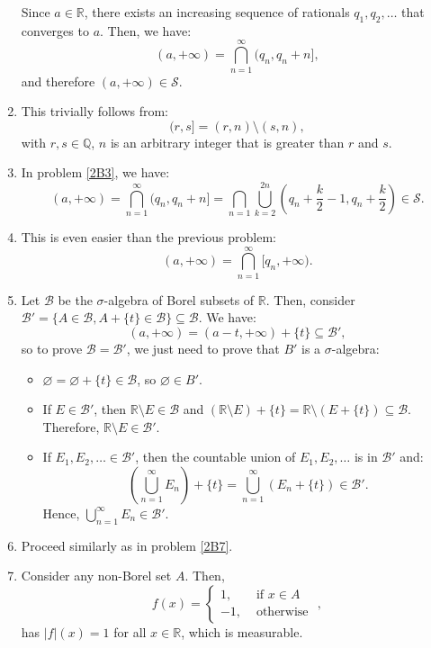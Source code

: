 \begin{enumerate}[label=\textbf{2B.\arabic*}]
    Since \( a \in \mathbb{R} \), there exists an increasing sequence of
    rationals \( q_{1}, q_{2}, \ldots  \) that converges to \( a \). Then, we
    have:
    \[
      (a, +\infty) = \bigcap_{n = 1}^{\infty} (q_{n}, q_{n} + n]
    ,\] and therefore \( (a, +\infty) \in \mathcal{S} \).
  \item This trivially follows from:
    \[
      (r, s] = (r, n) \setminus (s, n)
    ,\] with \( r, s \in \mathbb{Q} \), \( n \) is an arbitrary integer that is
    greater than \( r \) and \( s \).
  \item In problem \ref{2B3}, we have:
    \[
      (a, +\infty) = \bigcap_{n = 1}^{\infty} (q_{n}, q_{n} + n] = \bigcap_{n =
      1} \bigcup_{k = 2}^{2n} \left( q_{n} + \frac{k}{2} - 1, q_{n} + \frac{k}{2}
      \right) \in \mathcal{S}
    .\]
  \item This is even easier than the previous problem:
    \[
      (a, +\infty) = \bigcap_{n = 1}^{\infty} [q_{n}, +\infty)
    .\]
  \item \label{2B7}
    Let \( \mathcal{B} \) be the \( \sigma \)-algebra of Borel subsets of \(
    \mathbb{R}\). Then, consider \( \mathcal{B}' = \{A \in \mathcal{B}, A +
    \{t\} \in \mathcal{B} \} \subseteq \mathcal{B}  \). We have:
    \[
      (a, +\infty) = (a - t, +\infty)  + \{t\} \subseteq \mathcal{B}' 
    ,\] so to prove \( \mathcal{B} = \mathcal{B}' \), we just need to prove that
    \( B'\) is a \( \sigma \)-algebra:
    \begin{itemize}
    \item \( \varnothing = \varnothing + \{t\} \in \mathcal{B}  \), so \(
      \varnothing \in B' \).
    \item If \( E \in \mathcal{B}' \), then \( \mathbb{R} \setminus E \in
      \mathcal{B} \) and \( (\mathbb{R} \setminus E) + \{t\} = \mathbb{R}
      \setminus (E + \{t\}  ) \subseteq \mathcal{B}  \). Therefore, \(
      \mathbb{R} \setminus E \in \mathcal{B}' \).
    \item If \( E_{1}, E_{2}, \ldots \in \mathcal{B}' \), then the countable
      union of \( E_{1}, E_{2}, \ldots  \) is in \( \mathcal{B}' \) and:
      \[
        \left( \bigcup_{n = 1}^{\infty} E_{n} \right) + \{t\}   = \bigcup_{n =
        1}^{\infty} \left( E_{n} + \{t\}   \right) \in \mathcal{B}'
      .\] Hence, \( \bigcup_{n = 1}^{\infty} E_{n} \in \mathcal{B}' \).
    \end{itemize}
  \item Proceed similarly as in problem \ref{2B7}.
  \item Consider any non-Borel set \( A \). Then,
    \[
      f(x) = \begin{cases}
        1, &\text{ if } x \in A\\
        -1, & \text{ otherwise }
      \end{cases}
    ,\] has \( |f|(x) = 1 \) for all \( x \in \mathbb{R} \), which is
    measurable.


\end{enumerate}
